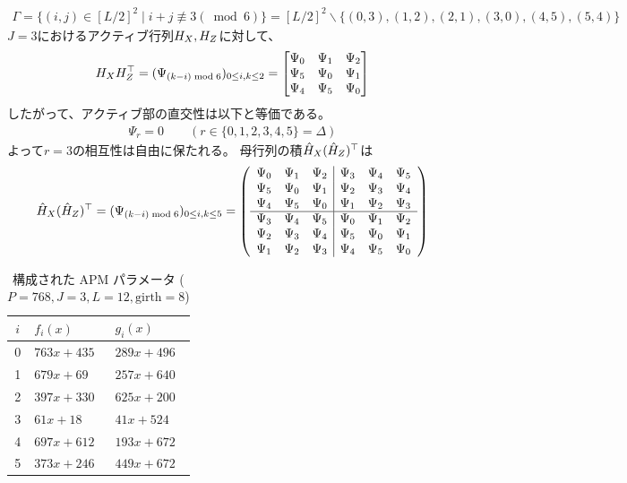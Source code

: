 \documentclass[a4paper,11pt,dvipdfmx]{jsarticle}
\theoremstyle{definition}
\begin{document}
\begin{align}
  \Gamma = \{(i,j)\in[L/2]^2\mid i+j\not\equiv 3(\bmod 6)\} = [L/2]^2\backslash\{(0,3),(1,2),(2,1),(3,0),(4,5),(5,4)\}
\end{align}
$J=3$におけるアクティブ行列$H_X,H_Z$に対して、
\begin{align}
  H_XH_Z^\top = (\Psi_{(k-i)\bmod 6})_{0\leq i,k\leq 2} = \begin{bmatrix}
    \Psi_0 & \Psi_1 & \Psi_2 \\
    \Psi_5 & \Psi_0 & \Psi_1 \\
    \Psi_4 & \Psi_5 & \Psi_0
  \end{bmatrix}
\end{align}
したがって、アクティブ部の直交性は以下と等価である。
\begin{align}
  \Psi_r = 0 \qquad(r\in\{0,1,2,3,4,5\}=\Delta)
\end{align}
よって$r=3$の相互性は自由に保たれる。
母行列の積$\hat{H}_X(\hat{H}_Z)^\top$は
\begin{align}
  \hat{H}_X(\hat{H}_Z)^\top = (\Psi_{(k-i)\bmod 6})_{0\leq i,k\leq 5} = \left(\begin{array}{ccc|ccc}
    \Psi_0 & \Psi_1 & \Psi_2 & \Psi_3 & \Psi_4 & \Psi_5 \\
    \Psi_5 & \Psi_0 & \Psi_1 & \Psi_2 & \Psi_3 & \Psi_4 \\
    \Psi_4 & \Psi_5 & \Psi_0 & \Psi_1 & \Psi_2 & \Psi_3 \\ \hline
    \Psi_3 & \Psi_4 & \Psi_5 & \Psi_0 & \Psi_1 & \Psi_2 \\
    \Psi_2 & \Psi_3 & \Psi_4 & \Psi_5 & \Psi_0 & \Psi_1 \\
    \Psi_1 & \Psi_2 & \Psi_3 & \Psi_4 & \Psi_5 & \Psi_0
  \end{array}\right)
\end{align}
\begin{table}[htbp]
  \centering
  \caption{構成された APM パラメータ ($P = 768, J = 3, L = 12, \text{girth}=8$)}
  \begin{tabular}{c|l|l}
    \hline
    $i$ & $f_i(x)$ & $g_i(x)$ \\ \hline
    0 & $763x + 435$ & $289x + 496$ \\
    1 & $679x + 69$ & $257x + 640$ \\
    2 & $397x + 330$ & $625x + 200$ \\
    3 & $61x + 18$ & $41x + 524$ \\
    4 & $697x + 612$ & $193x + 672$ \\
    5 & $373x + 246$ & $449x + 672$ \\ \hline
  \end{tabular}
\end{table}
\end{document}
